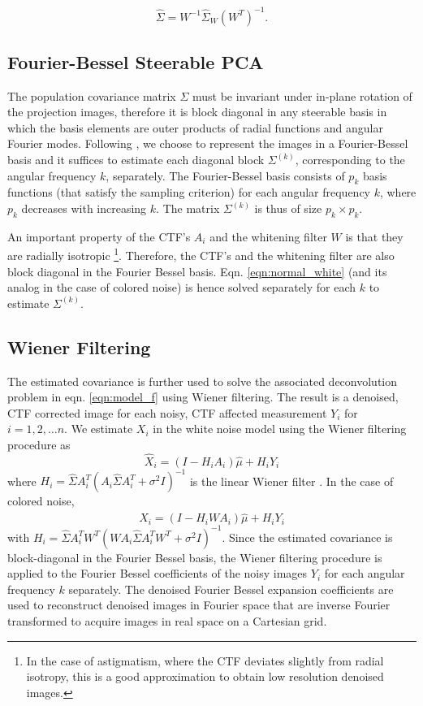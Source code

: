 \documentclass[review]{elsarticle}
\begin{document}
\begin{equation}
\hat{\Sigma} = W^{-1} \hat{\Sigma}_W (W^T)^{-1} .
\end{equation}


\subsection{Fourier-Bessel Steerable PCA}
\label{sec:fb_basis}
The population covariance matrix $\Sigma$ must be invariant under in-plane 
rotation of the projection images, therefore it is block diagonal in any steerable basis in which the 
basis elements are outer products of radial functions and angular Fourier modes. 
Following \cite{ffbspca}, we 
choose to represent the images in a Fourier-Bessel basis and it suffices to 
estimate each diagonal block $\Sigma^{(k)}$, corresponding to the angular frequency $k$, separately. 
The Fourier-Bessel basis \cite{ffbspca} consists of $p_k$ basis functions (that satisfy
the sampling criterion) for each angular frequency $k$, where $p_k$ decreases with increasing $k$.
The matrix $\Sigma^{(k)}$ is thus of size $p_k \times p_k$.

An important property
of the CTF's $A_i$ and the whitening filter $W$ is that they are radially isotropic \footnote{In the case of
astigmatism, where the CTF deviates slightly from radial isotropy, this is a 
good approximation to obtain low resolution
denoised images.}. 
Therefore, the CTF's and the whitening filter
are also block diagonal in the Fourier Bessel basis. Eqn. 
\ref{eqn:normal_white} (and its analog in the case of colored noise)
is hence solved separately for each $k$ to estimate $\Sigma^{(k)}$.





\subsection{Wiener Filtering}
\label{sec:wf}
The estimated covariance is
further used to solve the associated deconvolution problem
in eqn. \ref{eqn:model_f} using Wiener filtering. The result is a denoised, CTF 
corrected image for each noisy, CTF affected
measurement $Y_i$ for $i=1,2,\ldots n$. We
estimate $X_i$ in the white noise model using the Wiener 
filtering procedure as
\begin{equation}
\hat X_i = (I-H_iA_{i})\hat\mu + H_iY_i 
\end{equation}
where $H_i = \hat \Sigma A_{i}^T ( A_{i} \hat \Sigma A_{i}^T + \sigma^2 
I)^{-1} $ is the linear Wiener filter \cite{wiener_deriv}. In the case of colored noise,
\begin{equation}
\hat X_i = (I-H_iWA_{i})\hat\mu + H_iY_i 
\end{equation}
with $H_i = \hat \Sigma A_{i}^T W^T (W A_{i} \hat \Sigma A_{i}^T W^T 
+ \sigma^2 I)^{-1}$. Since the estimated covariance
is block-diagonal in the Fourier Bessel basis, the Wiener filtering
procedure is applied to the Fourier Bessel coefficients of the noisy 
images $Y_i$ for each angular frequency $k$ separately. The denoised 
Fourier Bessel expansion coefficients
are used to reconstruct denoised images in Fourier space that are inverse Fourier 
transformed to acquire images in real space on a Cartesian grid.
\end{document}
